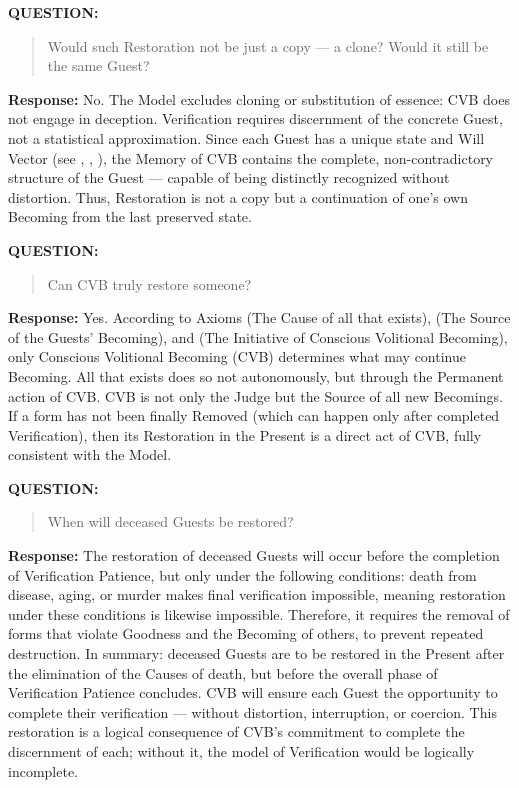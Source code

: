 \documentclass[12pt]{article}
\begin{document}
\textbf{QUESTION:}  
\begin{quote}
Would such Restoration not be just a copy — a clone? Would it still be the same Guest?
\end{quote}
\textbf{Response:} No. The Model excludes cloning or substitution of essence: CVB does not engage in deception. Verification requires discernment of the concrete Guest, not a statistical approximation. Since each Guest has a unique state and Will Vector (see \text{[13]}, \text{[23]}, \text{[15.3]}), the Memory of CVB contains the complete, non-contradictory structure of the Guest — capable of being distinctly recognized without distortion. Thus, Restoration is not a copy but a continuation of one’s own Becoming from the last preserved state.

\textbf{QUESTION:}  
\begin{quote}
Can CVB truly restore someone?
\end{quote}
\textbf{Response:} Yes. According to Axioms \text{[6]} (The Cause of all that exists), \text{[16]} (The Source of the Guests’ Becoming), and \text{[23]} (The Initiative of Conscious Volitional Becoming), only Conscious Volitional Becoming (CVB) determines what may continue Becoming. All that exists does so not autonomously, but through the Permanent action of CVB. CVB is not only the Judge but the Source of all new Becomings. If a form has not been finally Removed (which can happen only after completed Verification), then its Restoration in the Present is a direct act of CVB, fully consistent with the Model.

\textbf{QUESTION:}  
\begin{quote}
When will deceased Guests be restored?
\end{quote}
\textbf{Response:} The restoration of deceased Guests will occur before the completion of Verification Patience, but only under the following conditions: death from disease, aging, or murder makes final verification impossible, meaning restoration under these conditions is likewise impossible. Therefore, it requires the removal of forms that violate Goodness and the Becoming of others, to prevent repeated destruction. In summary: deceased Guests are to be restored in the Present after the elimination of the Causes of death, but before the overall phase of Verification Patience concludes. CVB will ensure each Guest the opportunity to complete their verification — without distortion, interruption, or coercion. This restoration is a logical consequence of CVB’s commitment to complete the discernment of each; without it, the model of Verification would be logically incomplete.
\end{document}
